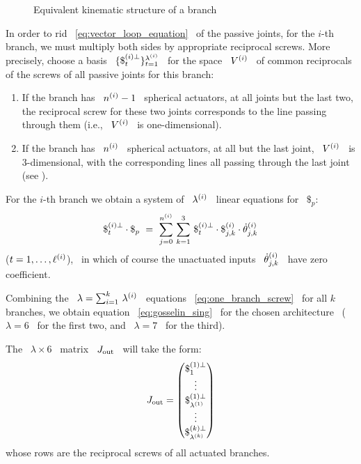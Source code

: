 \begin{figure}[htb]
\centering \epsfysize=7cm \leavevmode {}
\caption{Equivalent kinematic structure of a branch}
\label{fig:screws}
\end{figure}

In order to rid \ \eqref{eq:vector_loop_equation} \ of the passive
joints, for the $i$-th branch, we must multiply both sides by
appropriate reciprocal screws. More precisely, choose a basis \
$\{\$^{({i})\perp}_{t}\}_{t=1}^{\lambda\sp{({i})}}$ \ for the space \ $V\sp{({i})}$ \ of common
reciprocals of the screws of all passive joints for this branch:

\begin{enumerate}
\renewcommand{\labelenumi}{(\alph{enumi})}
%
\item If the branch has \ $n\sp{({i})}-1$ \ spherical actuators, at all
  joints but the last two, the reciprocal screw for these two joints
  corresponds to the line passing through them (i.e., \ $V\sp{({i})}$ \ is
  one-dimensional).
%
\item If the branch has \ $n\sp{({i})}$ \ spherical actuators, at all but
  the last joint, \ $V\sp{({i})}$ \ is   $3$-dimensional, with the
  corresponding lines all passing through the last joint (see \cite[Ch. 5]{T}).
%
\end{enumerate}

For the $i$-th branch we obtain a system of \ $\lambda\sp{({i})}$ \ linear
equations for \ $\$_{p}$:
%
\begin{equation}
\label{eq:one_branch_screw}
%
\sjp{i}_{t} \cdot \$_p~=~\sum_{j=0}^{\nj{i}}\,\sum_{k=1}^{3}\,
\sjp{i}_{t}\cdot \sj{i}_{j,k}\cdot \dot{\theta}\up{i}_{j,k}
%
\end{equation}
%
($t=1,\dotsc,\ell\sp{({i})}$), \ in which of course the unactuated inputs \
$\dot{\theta}\sp{({i})}_{j,k}$ \ have zero coefficient.

Combining the \ $\lambda=\sum_{i=1}^{k}\,\lambda\sp{({i})}$ \ equations \
\eqref{eq:one_branch_screw} \ for all $k$ branches, we
obtain equation \ \eqref{eq:gosselin_sing} \ for the chosen
architecture \ ($\lambda=6$ \ for the first two, and \ $\lambda=7$ \
for the third).

The \ $\lambda\times 6$ \ matrix \ $J_{\operatorname{out}}$ \ will take the form:
%
\begin{equation}
\label{eq:six_branches_Jout}
%
J_{\out}=
\begin{pmatrix}
\sjp{1}_{1}\\
\vdots\\
\sjp{1}_{\laj{1}}\\
\vdots\\
\sjp{k}_{\laj{k}}
\end{pmatrix}
%
\end{equation}
%
whose rows are the reciprocal screws of all actuated branches.

